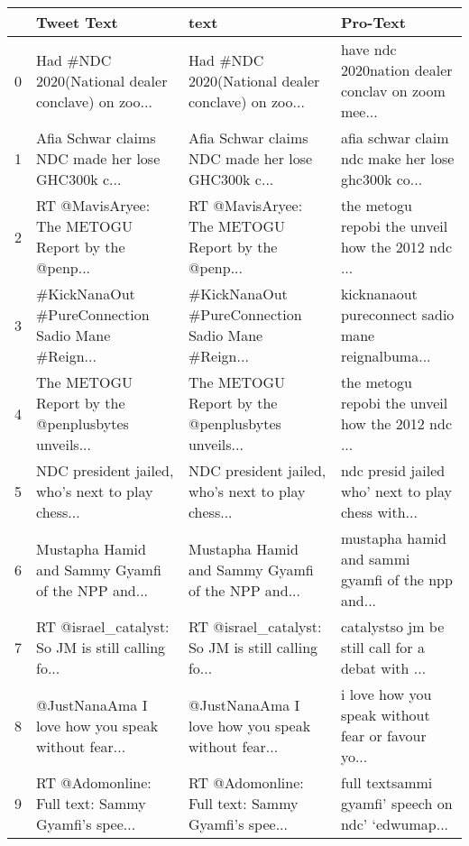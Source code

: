 \begin{tabular}{llll}
\toprule
{} &                                         Tweet Text &                                               text &                                           Pro-Text \\
\midrule
0 &  Had \#NDC 2020(National dealer conclave) on zoo... &  Had \#NDC 2020(National dealer conclave) on zoo... &  have ndc 2020nation dealer conclav on zoom mee... \\
1 &  Afia Schwar claims NDC made her lose GHC300k c... &  Afia Schwar claims NDC made her lose GHC300k c... &  afia schwar claim ndc make her lose ghc300k co... \\
2 &  RT @MavisAryee: The METOGU Report by the @penp... &  RT @MavisAryee: The METOGU Report by the @penp... &  the metogu repobi the unveil how the 2012 ndc ... \\
3 &  \#KickNanaOut \#PureConnection Sadio Mane \#Reign... &  \#KickNanaOut \#PureConnection Sadio Mane \#Reign... &  kicknanaout pureconnect sadio mane reignalbuma... \\
4 &  The METOGU Report by the @penplusbytes unveils... &  The METOGU Report by the @penplusbytes unveils... &  the metogu repobi the unveil how the 2012 ndc ... \\
5 &  NDC president jailed, who’s next to play chess... &  NDC president jailed, who’s next to play chess... &  ndc presid jailed who’ next to play chess with... \\
6 &  Mustapha Hamid and Sammy Gyamfi of the NPP and... &  Mustapha Hamid and Sammy Gyamfi of the NPP and... &  mustapha hamid and sammi gyamfi of the npp and... \\
7 &  RT @israel\_catalyst: So JM is still calling fo... &  RT @israel\_catalyst: So JM is still calling fo... &  catalystso jm be still call for a debat with  ... \\
8 &  @JustNanaAma I love how you speak without fear... &  @JustNanaAma I love how you speak without fear... &  i love how you speak without fear or favour yo... \\
9 &  RT @Adomonline: Full text: Sammy Gyamfi’s spee... &  RT @Adomonline: Full text: Sammy Gyamfi’s spee... &  full textsammi gyamfi’ speech on ndc’ ‘edwumap... \\
\bottomrule
\end{tabular}
